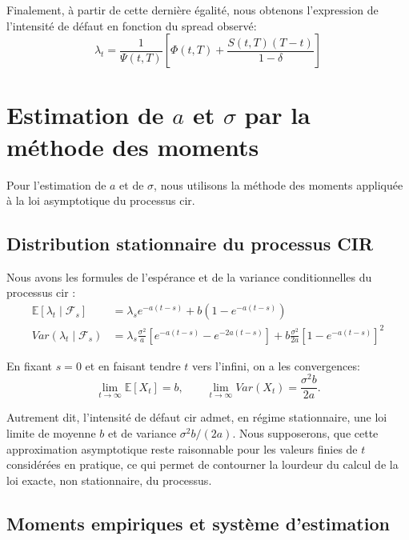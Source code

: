 Finalement, à partir de cette dernière égalité, nous obtenons l'expression de l'intensité de défaut en fonction du spread observé:
\begin{equation}
    \lambda_t = \frac{1}{\Psi(t,T)}\left[\Phi(t,T) + \frac{S(t,T)(T-t)}{1-\delta}\right]
    \label{eq:relation_spread_lambda}
\end{equation}


\section{Estimation de $a$ et $\sigma$ par la méthode des moments}

Pour l'estimation de $a$ et de $\sigma$, nous utilisons la méthode des moments appliquée à la loi asymptotique du processus \gls{cir}.

\subsection{Distribution stationnaire du processus CIR}

Nous avons les formules de l'espérance et de la variance conditionnelles du processus \gls{cir} :
\begin{align*}
    \mathbb{E}[\lambda_t \mid \mathcal{F}_s] &= \lambda_s e^{-a(t-s)} + b\left(1-e^{-a(t-s)}\right) \\
    Var(\lambda_t \mid \mathcal{F}_s) &= \lambda_s \frac{\sigma^2}{a}\left[e^{-a(t-s)}-e^{-2a(t-s)}\right] + b\frac{\sigma^2}{2a}\left[1-e^{-a(t-s)}\right]^2
\end{align*}

En fixant $s=0$ et en faisant tendre $t$ vers l'infini, on a les convergences:
\begin{equation}
\lim_{t\to\infty} \mathbb{E}[X_t] = b, \qquad
\lim_{t\to\infty} Var(X_t) = \frac{\sigma^2 b}{2a}.
\label{eq:limites-cir}
\end{equation}

Autrement dit, l'intensité de défaut \gls{cir} admet, en régime stationnaire, une loi limite de moyenne $b$ et de variance $\sigma^2 b /(2a)$. Nous supposerons, que cette approximation asymptotique reste raisonnable pour les valeurs finies de $t$ considérées en pratique, ce qui permet de contourner la lourdeur du calcul de la loi exacte, non stationnaire, du processus.


\subsection{Moments empiriques et système d'estimation}

